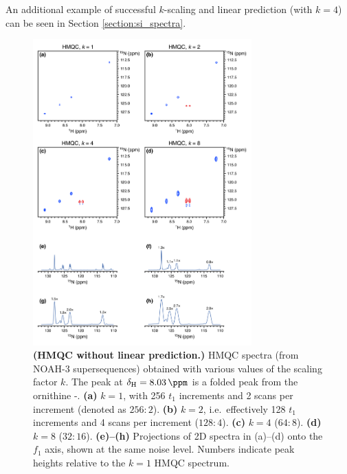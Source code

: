An additional example of successful $k$-scaling and linear prediction (with $k = 4$) can be seen in Section \ref{section:si_spectra}.

\begin{figure}
    \centering
    \includegraphics[width=0.75\textwidth]{./figures/hmqc_kscale.png}
    \caption{
        \textbf{(HMQC without linear prediction.)}
        \nitrogen{} HMQC spectra (from NOAH-3  supersequences) obtained with various values of the scaling factor $k$.
        The peak at $\delta_{\ce{H}} = \SI{8.03}{\ppm}$ is a folded peak from the ornithine \textdelta-.
        \textbf{(a)} $k = 1$, with 256 $t_1$ increments and 2 scans per increment (denoted as $256:2$).
        \textbf{(b)} $k = 2$, i.e.\ effectively 128 $t_1$ increments and 4 scans per increment ($128:4$).
        \textbf{(c)} $k = 4$ ($64:8$).
        \textbf{(d)} $k = 8$ ($32:16$).
        \textbf{(e)--(h)} Projections of 2D spectra in (a)--(d) onto the $f_1$ axis, shown at the same noise level.
        Numbers indicate peak heights relative to the $k = 1$ HMQC spectrum.
        \grami{}
    }
    \label{fig:hmqc_kscale}
\end{figure}

